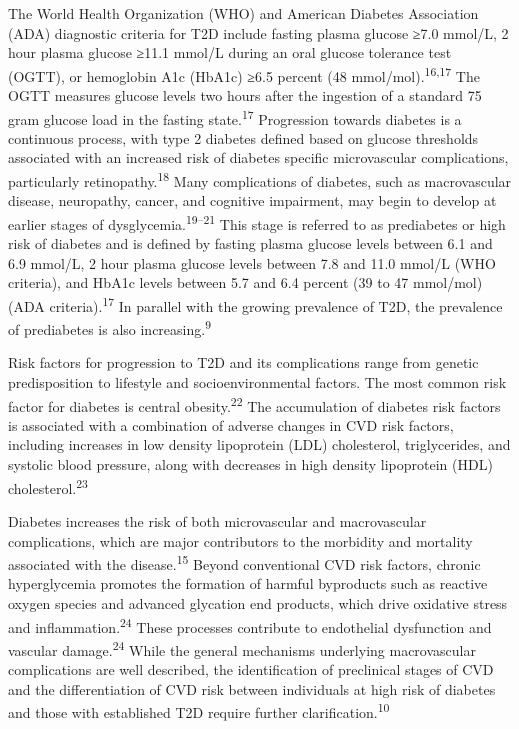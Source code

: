 \documentclass[
  a4paper,
  headsepline=true,
  open=left]{scrbook}
\begin{document}
The World Health Organization (WHO) and American Diabetes Association
(ADA) diagnostic criteria for T2D include fasting plasma glucose ≥7.0
mmol/L, 2 hour plasma glucose ≥11.1 mmol/L during an oral glucose
tolerance test (OGTT), or hemoglobin A1c (HbA1c) ≥6.5 percent (48
mmol/mol).\textsuperscript{16,17} The OGTT measures glucose levels two
hours after the ingestion of a standard 75 gram glucose load in the
fasting state.\textsuperscript{17} Progression towards diabetes is a
continuous process, with type 2 diabetes defined based on glucose
thresholds associated with an increased risk of diabetes specific
microvascular complications, particularly
retinopathy.\textsuperscript{18} Many complications of diabetes, such as
macrovascular disease, neuropathy, cancer, and cognitive impairment, may
begin to develop at earlier stages of
dysglycemia.\textsuperscript{19--21} This stage is referred to as
prediabetes or high risk of diabetes and is defined by fasting plasma
glucose levels between 6.1 and 6.9 mmol/L, 2 hour plasma glucose levels
between 7.8 and 11.0 mmol/L (WHO criteria), and HbA1c levels between 5.7
and 6.4 percent (39 to 47 mmol/mol) (ADA criteria).\textsuperscript{17}
In parallel with the growing prevalence of T2D, the prevalence of
prediabetes is also increasing.\textsuperscript{9}

Risk factors for progression to T2D and its complications range from
genetic predisposition to lifestyle and socioenvironmental factors. The
most common risk factor for diabetes is central
obesity.\textsuperscript{22} The accumulation of diabetes risk factors
is associated with a combination of adverse changes in CVD risk factors,
including increases in low density lipoprotein (LDL) cholesterol,
triglycerides, and systolic blood pressure, along with decreases in high
density lipoprotein (HDL) cholesterol.\textsuperscript{23}

Diabetes increases the risk of both microvascular and macrovascular
complications, which are major contributors to the morbidity and
mortality associated with the disease.\textsuperscript{15} Beyond
conventional CVD risk factors, chronic hyperglycemia promotes the
formation of harmful byproducts such as reactive oxygen species and
advanced glycation end products, which drive oxidative stress and
inflammation.\textsuperscript{24} These processes contribute to
endothelial dysfunction and vascular damage.\textsuperscript{24} While
the general mechanisms underlying macrovascular complications are well
described, the identification of preclinical stages of CVD and the
differentiation of CVD risk between individuals at high risk of diabetes
and those with established T2D require further
clarification.\textsuperscript{10}
\end{document}
